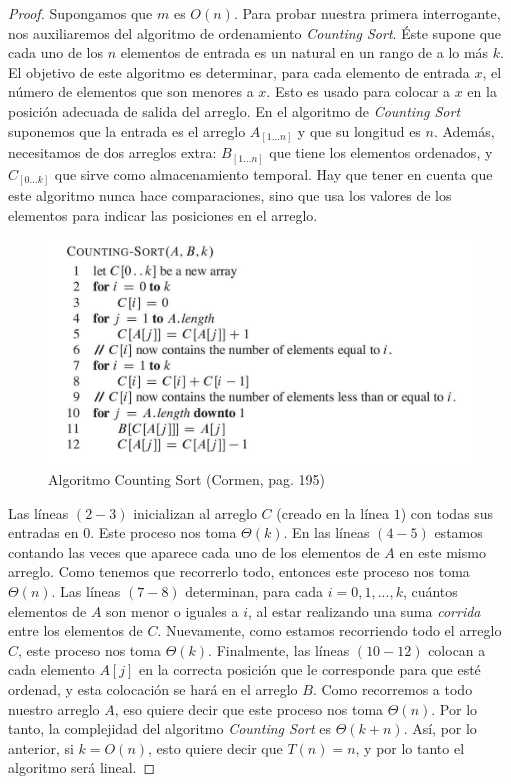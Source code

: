 \documentclass[letterpaper,11pt]{article}
\begin{document}
\begin{enumerate}
    \begin{proof}
        Supongamos que $m$ es $O(n)$. Para probar nuestra primera interrogante,
        nos auxiliaremos del algoritmo de ordenamiento \textit{Counting Sort}.
        Éste supone que cada uno de los $n$ elementos de entrada es un natural
        en un rango de a lo más $k$. El objetivo de este algoritmo es 
        determinar, para cada elemento de entrada $x$, el número de elementos 
        que son menores a $x$. Esto es usado para colocar a $x$ en la posición 
        adecuada de salida del arreglo. En el algoritmo de \textit{Counting 
        Sort} suponemos que la entrada es el arreglo $A_{[1...n]}$ y que su 
        longitud es $n$. Además, necesitamos de dos arreglos extra: 
        $B_{[1...n]}$ que tiene los elementos ordenados, y $C_{[0...k]}$ que 
        sirve como almacenamiento temporal. Hay que tener en cuenta que este 
        algoritmo nunca hace comparaciones, sino que usa los valores de los 
        elementos para indicar las posiciones en el arreglo.

        \begin{figure}[h]
            \centering
            \includegraphics[width=0.55\linewidth]
            {imagenes/counting-sort-normal.jpeg}
            \caption{Algoritmo Counting Sort (Cormen, pag. 195)}
            \label{fig:counting-sort-normal}
        \end{figure}

        Las líneas $(2 - 3)$ inicializan al arreglo $C$ (creado en la línea $1$)
        con todas sus entradas en $0$. Este proceso nos toma $\Theta(k)$. En las 
        líneas $(4 - 5)$ estamos contando las veces que aparece cada uno de los 
        elementos de $A$ en este mismo arreglo. Como tenemos que recorrerlo todo, 
        entonces este proceso nos toma $\Theta(n)$. Las líneas $(7 - 8)$ 
        determinan, para cada $i = 0, 1, ..., k$, cuántos elementos de $A$ son 
        menor o iguales a $i$, al estar realizando una suma \textit{corrida} 
        entre los elementos de $C$. Nuevamente, como estamos recorriendo todo 
        el arreglo $C$, este proceso nos toma $\Theta(k)$. Finalmente, las 
        líneas $(10 - 12)$ colocan a cada elemento $A[j]$ en la correcta 
        posición que le corresponde para que esté ordenad, y esta colocación
        se hará en el arreglo $B$. Como recorremos a todo nuestro arreglo $A$,
        eso quiere decir que este proceso nos toma $\Theta(n)$. Por lo tanto, 
        la complejidad del algoritmo \textit{Counting Sort} es $\Theta(k + n)$.
        Así, por lo anterior, si $k = O(n)$, esto quiere decir que $T(n) = n$, 
        y por lo tanto el algoritmo será lineal. 


\end{proof}
\end{enumerate}
\end{document}
